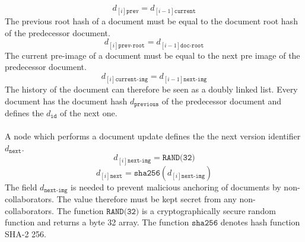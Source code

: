 \begin{equation}
d_{[i]\texttt{prev}} = d_{[i-1]\texttt{current}} 
\end{equation}
\newline
The previous root hash of a document must be equal to the document root hash of the predecessor document.
\begin{equation}
d_{[i]\texttt{prev-root}} = d_{[i-1]\texttt{doc-root}}
\end{equation}
\newline
The current pre-image of a document must be equal to the next pre image of the predecessor document.
\begin{equation}
d_{[i]\texttt{current-img}} = d_{[i-1]\texttt{next-img}}
\end{equation}
\newline
The history of the document can therefore be seen as a doubly linked list. Every document has the document hash $d_{\texttt{previous}}$ of the predecessor document and defines the $d_{\texttt{id}}$ of the next one.\\\\
A node which performs a document update defines the the next version identifier $d_{\texttt{next}}$.
\begin{equation}
d_{[i]\texttt{next-img}} = \texttt{RAND(32)}
\end{equation}
\begin{equation}
d_{[i]\texttt{next}} = \mathtt{sha256}(d_{[i]\texttt{next-img}})
\end{equation}
\newline
The field $d_{\texttt{next-img}}$ is needed to prevent malicious anchoring of documents by non-collaborators. The value therefore must be kept secret from any non-collaborators. The function $\texttt{RAND(32)}$ is a cryptographically secure random function and returns a byte 32 array. The function $\mathtt{sha256}$ denotes hash function SHA-2 256. 

